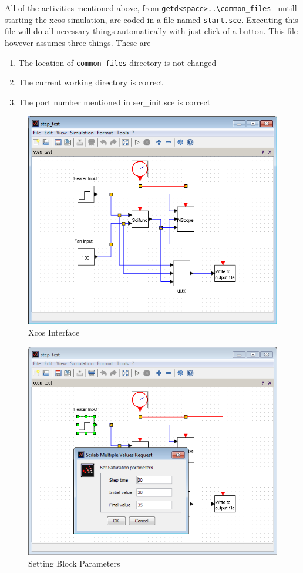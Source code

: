 All of the activities mentioned above, from {\tt getd<space>..\textbackslash common\_files\ } untill starting the xcos simulation, are coded in a file named {\tt start.sce}. Executing this file will do all necessary things automatically with just click of a button. This file however assumes three things. These are

\begin{enumerate}
\item The location of {\tt common-files} directory is not changed 
\item The current working directory is correct
\item The port number mentioned in  {\ttfamily ser\_init.sce} is correct
\end{enumerate}


\begin{figure}
\centering
\includegraphics[width=0.7\linewidth]{using-sbhs/xcos.png}
\caption{Xcos Interface}
\label{Xcosintr}
\end{figure}

\begin{figure}
\centering
\includegraphics[width=0.7\linewidth]{using-sbhs/xcos_block.png}
\caption{Setting Block Parameters}
\label{blk_parameters}
\end{figure}


